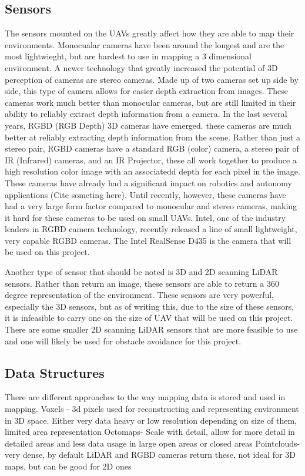 \documentclass[12pt, letterpaper]{article}
\begin{document}
\subsection{Sensors} 
The sensors mounted on the UAVs greatly affect how they are able to map their environments. Monocualar cameras have been around the longest and are the most lightwieght, but are hardest to use in mapping a 3 dimensional environment. A newer technology that greatly increased the potential of 3D perception of cameras are stereo cameras. Made up of two cameras set up side by side, this type of camera allows for easier depth extraction from images. These cameras work much better than monocular cameras, but are still limited in their ability to reliably extract depth information from a camera. In the last several years, RGBD (RGB Depth) 3D cameras have emerged. these cameras are much better at reliably extracting depth information from the scene. Rather than just a stereo pair, RGBD cameras have a standard RGB (color) camera, a stereo pair of IR (Infrared) cameras, and an IR Projector, these all work together to produce a high resolution color image with an associatedd depth for each pixel in the image. These cameras have already had a significant impact on robotics and autonomy applications (Cite someting here). Until recently, however, these cameras have had a very large form factor compared to monocular and stereo cameras, making it hard for these cameras to be used on small UAVs. Intel, one of the industry leaders in RGBD camera technology, recently released a line of small lightweight, very capable RGBD cameras. The Intel RealSense D435 is the camera that will be used on this project.

Another type of sensor that should be noted is 3D and 2D scanning LiDAR sensors. Rather than return an image, these sensors are able to return a 360 degree representation of the environment. These sensors are very powerful, especially the 3D sensors, but as of writing this, due to the size of these sensors, it is infeasible to carry one on the size of UAV that will be used on this project. There are some smaller 2D scanning LiDAR sensors that are more feasible to use and one will likely be used for obstacle avoidance for this project.
 
\subsection{Data Structures} 
There are different approaches to the way mapping data is stored and used in mapping. 
Voxels - 3d pixels used for reconstructing and representing environment in 3D space. Either very data heavy or low resolution depending on size of them, limited area representation
Octomaps- Scale with detail, allow for more detail in detailed areas and less data usage in large open areas or closed areas \cite{Hornung2013}
Pointclouds- very dense, by default LiDAR and RGBD cameras return these, not ideal for 3D maps, but can be good for 2D ones
\end{document}
